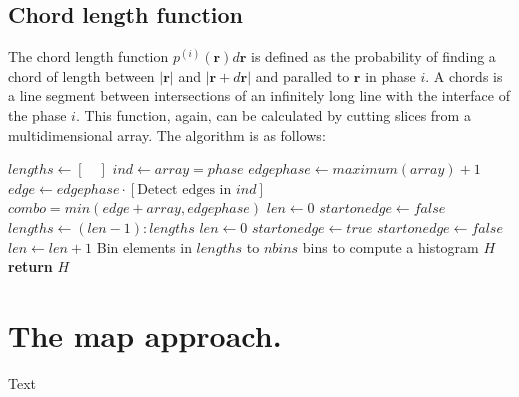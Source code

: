 \documentclass[reprint,amsmath,amssymb,aps,pre]{revtex4-1}
\begin{document}
\subsection{Chord length function}
The chord length function $p^{(i)}(\bm{r})d\bm{r}$ is defined as the probability of
finding a chord of length between $|\bm{r}|$ and $|\bm{r} + d\bm{r}|$ and
paralled to $\bm{r}$ in phase $i$. A chords is a line segment between
intersections of an infinitely long line with the interface of the phase
$i$. This function, again, can be calculated by cutting slices from a
multidimensional array. The algorithm is as follows:
\begin{algorithmic}[1]
    \State $lengths \gets [\quad]$
    \State $ind \gets array = phase$ 
    \State $edgephase \gets maximum(array) + 1$ 
    \State $edge \gets edgephase \cdot [\text{Detect edges in $ind$}]$ 
    \State $combo = min(edge + array, edgephase)$ 
        \State $len \gets 0$
        \State $startonedge \gets false$
              \State $lengths \gets (len-1):lengths$
            \EndIf
            \State $len \gets 0$
            \State $startonedge \gets true$
            \State $startonedge \gets false$
          \EndIf
          \State $len \gets len + 1$
        \EndFor
      \EndFor
    \EndFor
    \State Bin elements in $lengths$ to $nbins$ bins to compute a histogram $H$
    \State \textbf{return} $H$
  \EndProcedure
\end{algorithmic}

\section{The map approach.}
\label{mapsec}
Text
\end{document}
